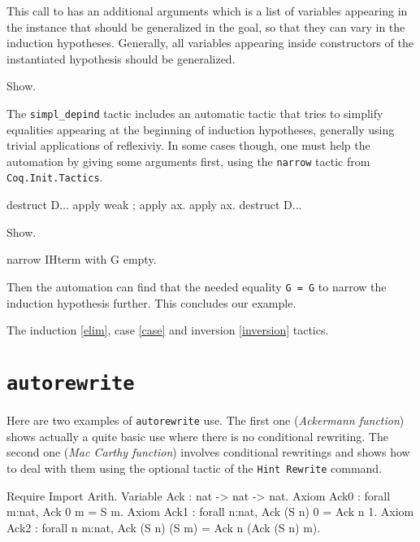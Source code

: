 \begin{coq_example*}
This call to \depind has an additional arguments which is a list of
variables appearing in the instance that should be generalized in the
goal, so that they can vary in the induction hypotheses. Generally, all
variables appearing inside constructors of the instantiated hypothesis
should be generalized. 

\begin{coq_example}
  Show.
\end{coq_example}

The {\tt simpl\_depind} tactic includes an automatic tactic that tries
to simplify equalities appearing at the beginning of induction
hypotheses, generally using trivial applications of
reflexiviy. In some cases though, one must help the automation by giving
some arguments first, using the {\tt narrow} tactic from  
{\tt Coq.Init.Tactics}.

\begin{coq_example*}
destruct D... apply weak ; apply ax. apply ax.
destruct D...
\end{coq_example*}
\begin{coq_example}
Show.
\end{coq_example}
\begin{coq_example}
  narrow IHterm with G empty.
\end{coq_example}

Then the automation can find that the needed equality {\tt G = G} to
narrow the induction hypothesis further. This concludes our example.

\SeeAlso The induction \ref{elim}, case \ref{case} and inversion \ref{inversion} tactics.

\section[\tt autorewrite]{\tt autorewrite\label{autorewrite-example}}

Here are two examples of {\tt autorewrite} use. The first one ({\em Ackermann
function}) shows actually a quite basic use where there is no conditional
rewriting. The second one ({\em Mac Carthy function}) involves conditional
rewritings and shows how to deal with them using the optional tactic of the
{\tt Hint~Rewrite} command.

\firstexample
{}

\begin{coq_example*}
Require Import Arith.
Variable Ack : 
           nat -> nat -> nat.
Axiom Ack0 : 
        forall m:nat, Ack 0 m = S m.
Axiom Ack1 : forall n:nat, Ack (S n) 0 = Ack n 1.
Axiom Ack2 : forall n m:nat, Ack (S n) (S m) = Ack n (Ack (S n) m).
\end{coq_example*}


\end{coq_example*}
